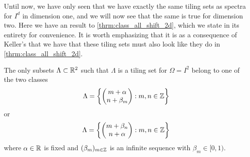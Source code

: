 \documentclass[../thesis.tex]{subfiles}
\begin{document}
Until now, we have only seen that we have exactly the same tiling sets as spectra for $I^d$ in dimension one, and we will now see that the same is true for dimension two. Here we have an  result to \cref{thrm:class_all_shift_2d}, which we state in its entirety for convenience. It is worth emphasizing that it is as a consequence of Keller's  that we have that these tiling sets must also look like they do in \cref{thrm:class_all_shift_2d}.

\begin{theorem}\label{thrm:class_all_tiling_2d}  %
    The only subsets $\Lambda \subset \mathbb{R}^2$ such that $\Lambda$ is a tiling set for $\Omega = I^2$ belong to one of the two classes
    \begin{equation}\label{eq:2d_all_shift_class_1_tiling}
        \Lambda = \left\{
            \begin{pmatrix}
            m + \alpha \\
            n + \beta_m
            \end{pmatrix} : m,n \in  \mathbb{Z}
            \right\}
    \end{equation}
    or
    \begin{equation}\label{eq:2d_all_shift_class_2_tiling}
        \Lambda = \left\{
            \begin{pmatrix}
            m + \beta_n\\
            n + \alpha
            \end{pmatrix} : m,n \in  \mathbb{Z}
            \right\}
    \end{equation}
    where $\alpha \in \mathbb{R}$ is fixed and $(\beta_m)_{m\in \mathbb{Z}}$ is an infinite sequence with $\beta_m \in [0,1)$.
\end{theorem}
\end{document}
